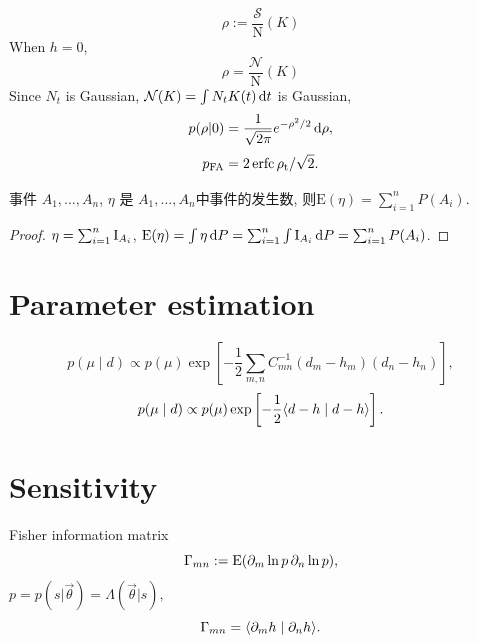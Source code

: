 \begin{equation}
    \rho:=\frac{\mathcal{S}}{\mathrm{N}}(K)
\end{equation}
When $h=0$,
\begin{equation}
    \rho=\frac{\mathcal{N}}{\mathrm{N}}(K)
\end{equation}
Since $N_t$ is Gaussian, $\mathcal{N}(K)=\int N_tK(t)\,\mathrm{d} t$ is Gaussian,
\begin{equation}
    p(\rho|0)=\frac{1}{\sqrt{2\pi}}e^{-\rho^2/2}\,\mathrm{d}\rho,
\end{equation}
\begin{equation}
    p_{\text{FA}}=2\operatorname{erfc}{\rho_\text{t}/\sqrt{2}}.
\end{equation}
\begin{theorem}
    事件 $A_1,\dots,A_n$, $\eta$ 是 $A_1,\dots,A_n$中事件的发生数, 则$\mathrm{E}(\eta)=\sum_{i=1}^nP(A_i)$.
\end{theorem}
\begin{proof}
    $\eta=\sum_{i=1}^n\text{I}_{A_i}$, $\text{E}(\eta)=\int\eta\,\mathrm{d} P=\sum_{i=1}^n\int\text{I}_{A_i}\,\mathrm{d} P=\sum_{i=1}^nP(A_i)$.
\end{proof}

\section{Parameter estimation}

\begin{equation}
    p(\mu\mid d)\propto p(\mu)\exp\left[-\frac{1}{2}\sum_{m,n}C_{mn}^{-1}(d_m-h_m)(d_n-h_n)\right],
\end{equation}
\begin{equation}
    p(\mu\mid d)\propto p(\mu)\exp\left[-\frac{1}{2}\langle d-h\mid d-h \rangle\right].
\end{equation}

\section{Sensitivity}

Fisher information matrix
\begin{equation}
    \Gamma_{mn}:=\text{E}(\partial_m \ln p\,\partial_n \ln p),
\end{equation}
$p=p(s|\vec{\theta})=\Lambda(\vec{\theta}|s)$,
\begin{equation}
    \Gamma_{mn}=\langle \partial_m h\mid \partial_n h \rangle.
\end{equation}
